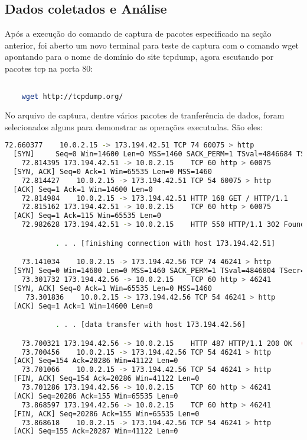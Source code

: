 \documentclass[a4paper]{report} %
\begin{document}
\subsection{Dados coletados e Análise}
\label{sub_http_dados}

	Após a execução do comando de captura de pacotes especificado na seção anterior, foi aberto um novo terminal para teste de captura com o comando wget apontando para o nome de domínio do site tcpdump, agora escutando por pacotes tcp na porta 80:

\begin{lstlisting}[language=bash]

	wget http://tcpdump.org/

\end{lstlisting}

	No arquivo de captura, dentre vários pacotes de tranferência de dados, foram selecionados alguns para demonstrar as operações executadas. São eles:

\begin{lstlisting}[language=bash]
	72.660377    10.0.2.15 -> 173.194.42.51 TCP 74 60075 > http
  [SYN] 	Seq=0 Win=14600 Len=0 MSS=1460 SACK_PERM=1 TSval=4846684 TSecr=0 WS=64
	72.814395 173.194.42.51 -> 10.0.2.15    TCP 60 http > 60075
  [SYN, ACK] Seq=0 Ack=1 Win=65535 Len=0 MSS=1460
	72.814427    10.0.2.15 -> 173.194.42.51 TCP 54 60075 > http
  [ACK] Seq=1 Ack=1 Win=14600 Len=0
	72.814984    10.0.2.15 -> 173.194.42.51 HTTP 168 GET / HTTP/1.1
	72.815162 173.194.42.51 -> 10.0.2.15    TCP 60 http > 60075
  [ACK] Seq=1 Ack=115 Win=65535 Len=0
	72.982628 173.194.42.51 -> 10.0.2.15    HTTP 550 HTTP/1.1 302 Found  (text/html)

     		. . . [finishing connection with host 173.194.42.51]

	73.141034    10.0.2.15 -> 173.194.42.56 TCP 74 46241 > http
  [SYN] Seq=0 Win=14600 Len=0 MSS=1460 SACK_PERM=1 TSval=4846804 TSecr=0 WS=64
	73.301732 173.194.42.56 -> 10.0.2.15    TCP 60 http > 46241
  [SYN, ACK] Seq=0 Ack=1 Win=65535 Len=0 MSS=1460
     73.301836    10.0.2.15 -> 173.194.42.56 TCP 54 46241 > http
  [ACK] Seq=1 Ack=1 Win=14600 Len=0

     		. . . [data transfer with host 173.194.42.56]

	73.700321 173.194.42.56 -> 10.0.2.15    HTTP 487 HTTP/1.1 200 OK  (text/html)
	73.700456    10.0.2.15 -> 173.194.42.56 TCP 54 46241 > http
  [ACK] Seq=154 Ack=20286 Win=41122 Len=0
	73.701066    10.0.2.15 -> 173.194.42.56 TCP 54 46241 > http
  [FIN, ACK] Seq=154 Ack=20286 Win=41122 Len=0
	73.701286 173.194.42.56 -> 10.0.2.15    TCP 60 http > 46241
  [ACK] Seq=20286 Ack=155 Win=65535 Len=0
	73.868597 173.194.42.56 -> 10.0.2.15    TCP 60 http > 46241
  [FIN, ACK] Seq=20286 Ack=155 Win=65535 Len=0
	73.868618    10.0.2.15 -> 173.194.42.56 TCP 54 46241 > http
  [ACK] Seq=155 Ack=20287 Win=41122 Len=0


\end{lstlisting}
\end{document}
